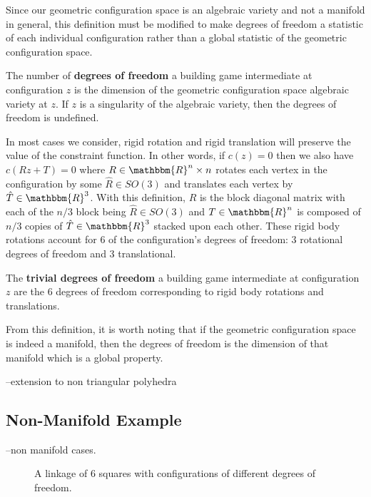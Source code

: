 Since our geometric configuration space is an algebraic variety and not a manifold in general, this definition must be modified to make degrees of freedom a statistic of each individual configuration rather than a global statistic of the geometric configuration space. 

\begin{mydef}
The number of \textbf{degrees of freedom} a building game intermediate at configuration $z$ is the dimension of the geometric configuration space algebraic variety at $z$. If $z$ is a singularity of the algebraic variety, then the degrees of freedom is undefined.
\end{mydef}

In most cases we consider, rigid rotation and rigid translation will preserve the value of the constraint function. In other words, if $c(z) = 0$ then we also have $c(Rz + T) = 0$ where $R \in \mathbbm{R}^{n}\times n$ rotates each vertex in the configuration by some $\hat{R} \in SO(3)$ and translates each vertex by $\hat{T} \in \mathbbm{R}^3$. With this definition, $R$ is the block diagonal matrix with each of the $n/3$ block being $\hat{R} \in SO(3)$ and $T \in \mathbbm{R}^n$ is composed of $n/3$ copies of $\hat{T} \in \mathbbm{R}^3$ stacked upon each other. These rigid body rotations account for $6$ of the configuration's degrees of freedom: $3$ rotational degrees of freedom and $3$ translational.
\begin{mydef}
The \textbf{trivial degrees of freedom} a building game intermediate at configuration $z$ are the $6$ degrees of freedom corresponding to rigid body rotations and translations.
\end{mydef}


From this definition, it is worth noting that if the geometric configuration space is indeed a manifold, then the degrees of freedom is the dimension of that manifold which is a global property.

--extension to non triangular polyhedra

\subsection{Non-Manifold Example}

--non manifold cases. 
\begin{figure}[ht]
\caption{A linkage of 6 squares with configurations of different degrees of freedom.}
\label{fig:SixSq}
\end{figure}


